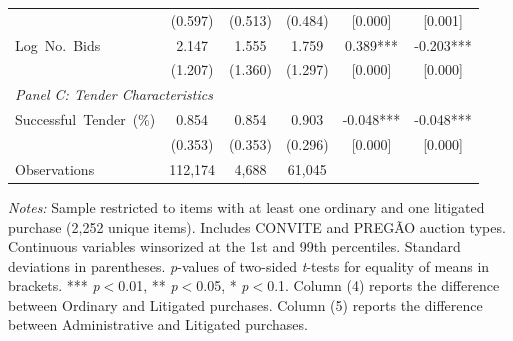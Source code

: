 \begin{table}[ht]
\begin{threeparttable}
\begin{tabular}{lccccc}
    & (0.597) & (0.513) & (0.484) & [0.000] & [0.001] \\[3pt]
    Log~No.~Bids & 2.147 & 1.555 & 1.759 & 0.389*** & -0.203*** \\
    & (1.207) & (1.360) & (1.297) & [0.000] & [0.000] \\[3pt]
    \hline
    \multicolumn{6}{l}{\textit{Panel C: Tender Characteristics}} \\[3pt]
    Successful~Tender~(\%) & 0.854 & 0.854 & 0.903 & -0.048*** & -0.048*** \\
    & (0.353) & (0.353) & (0.296) & [0.000] & [0.000] \\[3pt]
    \hline
    Observations & 112,174 & 4,688 & 61,045 & & \\
    \hline\hline
  \end{tabular}
  \begin{tablenotes}
    \small
    \item \textit{Notes:} Sample restricted to items with at least one ordinary and one litigated purchase (2,252 unique items). Includes CONVITE and PREG\~AO auction types. Continuous variables winsorized at the 1st and 99th percentiles. Standard deviations in parentheses.
    \textit{p}-values of two-sided \textit{t}-tests for equality of means in brackets.
    *** \textit{p}$<$0.01, ** \textit{p}$<$0.05, * \textit{p}$<$0.1.
    Column (4) reports the difference between Ordinary and Litigated purchases.
    Column (5) reports the difference between Administrative and Litigated purchases.
  \end{tablenotes}
  \end{threeparttable}
\end{table}
